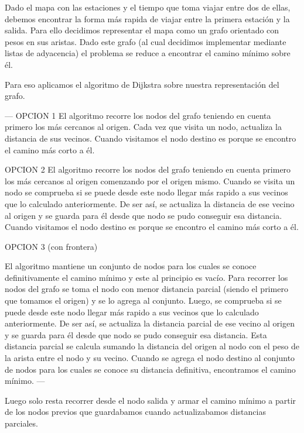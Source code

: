 Dado el mapa con las estaciones y el tiempo que toma viajar entre dos de ellas, debemos encontrar la forma más rapida de viajar entre la primera estación y la salida. Para ello decidimos representar el mapa como un grafo orientado con pesos en sus aristas. Dado este grafo (al cual decidimos implementar mediante listas de adyacencia) el problema se reduce a encontrar el camino mínimo sobre él.

Para eso aplicamos el algoritmo de Dijkstra sobre nuestra representación del grafo. 

---
OPCION 1
El algoritmo recorre los nodos del grafo teniendo en cuenta primero los más cercanos al origen. Cada vez que visita un nodo, actualiza la distancia de sus vecinos. Cuando visitamos el nodo destino es porque se encontro el camino más corto a él.

OPCION 2
El algoritmo recorre los nodos del grafo teniendo en cuenta primero los más cercanos al origen comenzando por el origen mismo. Cuando se visita un nodo se comprueba si se puede desde este nodo llegar más rapido a sus vecinos que lo calculado anteriormente. De ser así, se actualiza la distancia de ese vecino al origen y se guarda para él desde que nodo se pudo conseguir esa distancia. Cuando visitamos el nodo destino es porque se encontro el camino más corto a él.

OPCION 3 (con frontera)

El algoritmo mantiene un conjunto de nodos para los cuales se conoce definitivamente el camino mínimo y este al principio es vacío. Para recorrer los nodos del grafo se toma el nodo con menor distancia parcial (siendo el primero que tomamos el origen) y se lo agrega al conjunto. Luego, se comprueba si se puede desde este nodo llegar más rapido a sus vecinos que lo calculado anteriormente. De ser así, se actualiza la distancia parcial de ese vecino al origen y se guarda para él desde que nodo se pudo conseguir esa distancia. Esta distancia parcial se calcula sumando la distancia del origen al nodo con el peso de la arista entre el nodo y su vecino. Cuando se agrega el nodo destino al conjunto de nodos para los cuales se conoce su distancia definitiva, encontramos el camino mínimo.
---

Luego solo resta recorrer desde el nodo salida y armar el camino mínimo a partir de los nodos previos que guardabamos cuando actualizabamos distancias parciales.